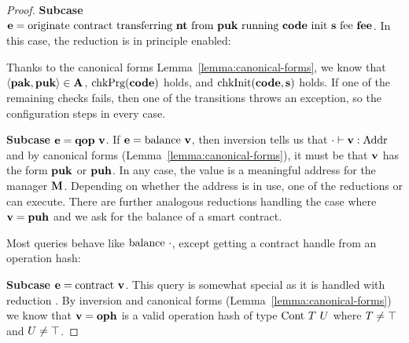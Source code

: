 \begin{proof}
  \bigskip\textbf{Subcase } $\EXPR = \ORIGINATE\NTEZ\PUK\CODE\INIT\MTEZ$. In
  this case, the  reduction is in principle
  enabled:
  \begin{mathpar}
  \end{mathpar}
  Thanks to the canonical forms Lemma~\ref{lemma:canonical-forms}, we
  know that $\Angle{\PAK,\PUK} \in \ACCOUNTS$, $\CHECKPRG (\CODE)$ holds, and $\CHECKINIT
  (\CODE, \STRING)$ holds. If one of the remaining checks fails,
  then one of the  transitions throws an
  exception, so the configuration steps in every case. 
  
  \bigskip\textbf{Subcase } $\EXPR = \QOP\ \VAL$. If $\EXPR =
  \GETBALANCE\VAL$, then inversion tells us that $\JTypeExpr\cdot{
    \VAL}\TADDR$ and by canonical forms
  (Lemma~\ref{lemma:canonical-forms}), it must be that $\VAL$ has the
  form $\PUK$ or $\PUH$. In any case, the value is a meaningful
  address for the manager $\MANAGERS$. Depending on whether the
  address is in use, one of the reductions
   or  can
  execute. There are further analogous reductions handling the case where
  $\VAL=\PUH$ and we ask for the balance of a smart contract.

  Most queries behave like $\GETBALANCE\cdot$, except getting a
  contract handle from an operation hash:

  \bigskip\textbf{Subcase }$\EXPR = \GETCONTRACT\VAL$. This query is somewhat
  special as it is handled with reduction
  . By inversion and canonical forms
  (Lemma~\ref{lemma:canonical-forms}) we know that $\VAL = \OPH$ is a
  valid operation hash of type $\TCONTRACT\ \TYPE\ \TYPEU$ where
  $\TYPE\ne\TNO$ and $\TYPEU \ne\TNO$.


\end{proof}

